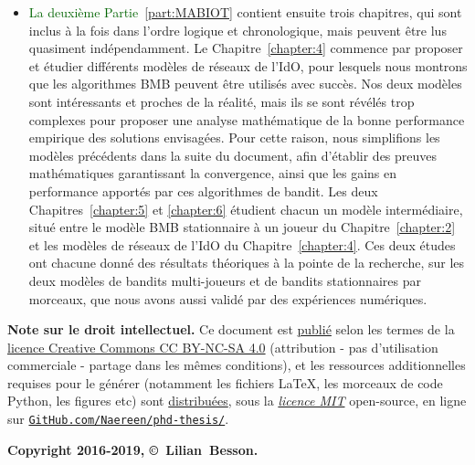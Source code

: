 \begin{resume_fr}
\begin{itemize}
    \item
\textcolor{darkgreen}{La deuxième Partie~\ref{part:MABIOT}} contient ensuite trois chapitres, qui sont inclus à la fois dans l'ordre logique et chronologique, mais peuvent être lus quasiment indépendamment.
Le Chapitre~\ref{chapter:4} commence par proposer et étudier différents modèles de réseaux de l'IdO, pour lesquels nous montrons que les algorithmes BMB peuvent être utilisés avec succès. Nos deux modèles sont intéressants et proches de la réalité, mais ils se sont révélés trop complexes pour proposer une analyse mathématique de la bonne performance empirique des solutions envisagées.
Pour cette raison, nous simplifions les modèles précédents dans la suite du document,
afin d'établir des preuves mathématiques garantissant la convergence, ainsi que les gains en performance apportés par ces algorithmes de bandit.
Les deux Chapitres~\ref{chapter:5} et \ref{chapter:6} étudient chacun un modèle intermédiaire, situé entre le modèle BMB stationnaire à un joueur du Chapitre~\ref{chapter:2} et les modèles de réseaux de l'IdO du Chapitre~\ref{chapter:4}.
Ces deux études ont chacune donné des résultats théoriques à la pointe de la recherche, sur les deux modèles de bandits multi-joueurs et de bandits stationnaires par morceaux, que nous avons aussi validé par des expériences numériques.

\end{itemize}


\vfill{}

\hr{}

\textbf{Note sur le droit intellectuel.}
%
Ce document est \href{https://github.com/Naereen/phd-thesis/}{publié} selon les termes de la
\href{https://creativecommons.org/licenses/by-nc-sa/4.0/}{licence Creative Commons CC BY-NC-SA 4.0} (attribution - pas d'utilisation commerciale - partage dans les mêmes conditions),
et les ressources additionnelles requises pour le générer (notamment les fichiers \LaTeX, les morceaux de code Python, les figures etc)
sont \href{https://github.com/Naereen/phd-thesis/}{distribuées},
sous la \href{https://lbesson.mit-license.org/}{\emph{licence MIT}} open-source,
en ligne sur \href{https://github.com/Naereen/phd-thesis/}{\texttt{GitHub.com/Naereen/phd-thesis/}}.


\begin{center}
    \textbf{Copyright 2016-2019, \copyright ~Lilian~Besson.}
\end{center}


\end{resume_fr}

